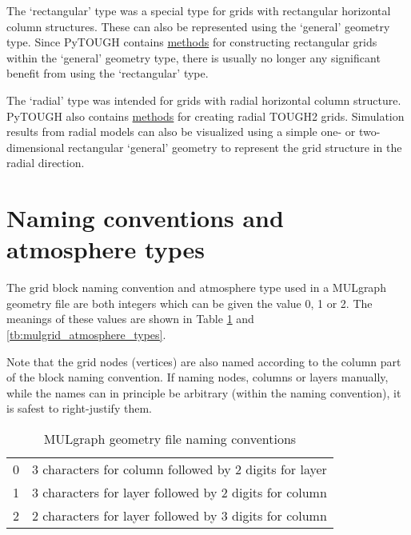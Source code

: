 The `rectangular' type was a special type for grids with rectangular horizontal column structures. These can also be represented using the `general' geometry type. Since PyTOUGH contains \hyperref[sec:mulgrid:rectangular]{methods} for constructing rectangular grids within the `general' geometry type, there is usually no longer any significant benefit from using the `rectangular' type.

The `radial' type was intended for grids with radial horizontal column structure. PyTOUGH also contains \hyperref[sec:t2grid:radial]{methods} for creating radial TOUGH2 grids. Simulation results from radial models can also be visualized using a simple one- or two-dimensional rectangular `general' geometry to represent the grid structure in the radial direction.

\section{Naming conventions and atmosphere types}
\label{geometry_format_conventions}

The grid block naming convention and atmosphere type used in a MULgraph geometry file are both integers which can be given the value 0, 1 or 2.  The meanings of these values are shown in Table \ref{tb:mulgrid_conventions} and \ref{tb:mulgrid_atmosphere_types}.

Note that the grid nodes (vertices) are also named according to the column part of the block naming convention. If naming nodes, columns or layers manually, while the names can in principle be arbitrary (within the naming convention), it is safest to right-justify them.

\begin{table}[h]
  \begin{center}
    \begin{tabular}{|l|p{85mm}|}
      \hline
      0 & 3 characters for column followed by 2 digits for layer \\
      1 & 3 characters for layer followed by 2 digits for column \\
      2 & 2 characters for layer followed by 3 digits for column \\
      \hline
    \end{tabular}
    \caption{MULgraph geometry file naming conventions}
    \label{tb:mulgrid_conventions}
  \end{center}
\end{table}

